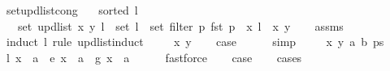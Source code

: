 \begin{isabellebody}
%
\isataginvisible
{}\isamarkupfalse%
\ set{\isacharunderscore}{\kern0pt}upd{\isacharunderscore}{\kern0pt}list{\isacharunderscore}{\kern0pt}cong{\isacharcolon}{\kern0pt}\isanewline
\ \ \ {\isachardoublequoteopen}sorted{}\ l{\isachardoublequoteclose}\isanewline
\ \ \ {\isachardoublequoteopen}set\ {\isacharparenleft}{\kern0pt}upd{\isacharunderscore}{\kern0pt}list\ x\ y\ l{\isacharparenright}{\kern0pt}\ {\isacharequal}{\kern0pt}\ set\ l\ {\isacharminus}{\kern0pt}\ set\ {\isacharparenleft}{\kern0pt}filter\ {\isacharparenleft}{\kern0pt}{\isasymlambda}p{\isachardot}{\kern0pt}\ fst\ p\ {\isacharequal}{\kern0pt}\ x{\isacharparenright}{\kern0pt}\ l{\isacharparenright}{\kern0pt}\ {\isasymunion}\ {\isacharbraceleft}{\kern0pt}{\isacharparenleft}{\kern0pt}x{\isacharcomma}{\kern0pt}\ y{\isacharparenright}{\kern0pt}{\isacharbraceright}{\kern0pt}{\isachardoublequoteclose}%
\endisataginvisible
{\isafoldinvisible}%
%
\isadeliminvisible
\isanewline
%
\endisadeliminvisible
%
\isadelimproof
\ \ %
\endisadelimproof
%
\isatagproof
{}\isamarkupfalse%
\ assms\isanewline
{}\isamarkupfalse%
\ {\isacharparenleft}{\kern0pt}induct\ l\ rule{\isacharcolon}{\kern0pt}\ upd{\isacharunderscore}{\kern0pt}list{\isachardot}{\kern0pt}induct{\isacharparenright}{\kern0pt}\isanewline
\ \ \isamarkupfalse%
\ {\isacharparenleft}{\kern0pt}{}\ x\ y{\isacharparenright}{\kern0pt}\isanewline
\ \ \isamarkupfalse%
\ {\isacharquery}{\kern0pt}case\isanewline
\ \ \ \ \isamarkupfalse%
\ simp\isanewline
{}\isamarkupfalse%
\isanewline
\ \ \isamarkupfalse%
\ {\isacharparenleft}{\kern0pt}{}\ x\ y\ a\ b\ ps{\isacharparenright}{\kern0pt}\isanewline
\ \ \isamarkupfalse%
\ {\isacharparenleft}{\kern0pt}l{\isacharparenright}{\kern0pt}\ {\isachardoublequoteopen}x\ {\isacharless}{\kern0pt}\ a{\isachardoublequoteclose}\ {\isacharbar}{\kern0pt}\ {\isacharparenleft}{\kern0pt}e{\isacharparenright}{\kern0pt}\ {\isachardoublequoteopen}x\ {\isacharequal}{\kern0pt}\ a{\isachardoublequoteclose}\ {\isacharbar}{\kern0pt}\ {\isacharparenleft}{\kern0pt}g{\isacharparenright}{\kern0pt}\ {\isachardoublequoteopen}x\ {\isachargreater}{\kern0pt}\ a{\isachardoublequoteclose}\isanewline
\ \ \ \ \isamarkupfalse%
\ fastforce\isanewline
\ \ \isamarkupfalse%
\ {\isacharquery}{\kern0pt}case\isanewline
\ \ \isamarkupfalse%
\ {\isacharparenleft}{\kern0pt}cases{\isacharparenright}{\kern0pt}\isanewline

\end{isabellebody}
